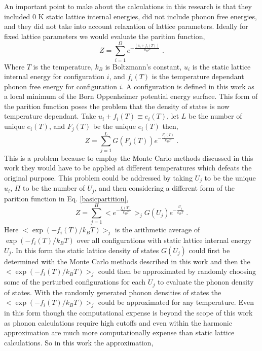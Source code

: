 \documentclass[aps,pre,reprint,superscriptaddress,showkeys]{revtex4-2}
\begin{document}
  An important point to make about the calculations in this research is that they  included 0 K static lattice internal energies, did not include phonon free energies, and they did not take into account relaxation of lattice parameters\cite{Holzwarth_group}. Ideally for fixed lattice parameters we would evaluate the parition function\cite{partition}, 
\begin{equation}
Z = \sum_{i=1}^{\Omega} e^{-\frac{(u_i + f_i(T))}{k_BT}}\;.
\label{basicpartition}
\end{equation}
 Where $T$ is the temperature, $k_B$ is Boltzmann's constant, $u_i$ is the static lattice internal energy for configuration $i$, and $f_i(T)$ is the temperature dependant phonon free energy for configuration $i$. A configuration is defined in this work as a local minimum of the Born Oppenheimer potential energy surface. This form of the parition function poses the problem that the density of states is now temperature dependant.  Take $u_i + f_i(T)\equiv e_i(T)$, let $L$ be the number of unique $e_i(T)$, and $F_j(T)$ be the unique $e_i(T)$ then, 
 \begin{equation}
 Z = \sum_{j=1}^{L}G(F_j(T))e^{-\frac{F_j(T)}{k_BT}}\;.
 \end{equation}
 This is a problem because to employ the Monte Carlo methods discussed in this work they would have to be applied at different temperatures which defeats the original purpose. This problem could be addressed by taking $U_j$ to be the unique $u_i$, $\Pi$ to be the number of $U_j$, and then considering a different form of the parition function in Eq. \ref{basicpartition}, 
 \begin{equation}
 Z= \sum_{j=1}^{\Pi}<e^{-\frac{f_i(T)}{k_BT}}>_jG(U_j)e^{-\frac{U_j}{k_BT}}\;.
 \end{equation}
 Here $<\exp(-f_i(T)/k_BT)>_j$ is the arithmetic average of $\exp(-f_i(T)/k_BT)$ over all configurations with static lattice internal energy $U_j$. In this form the static lattice density of states $G(U_j)$ could first be determined with the Monte Carlo methods described in this work and then the $<\exp(-f_i(T)/k_BT)>_j$ could then be approximated by randomly choosing some of the perturbed configurations for each $U_j$ to evaluate the phonon density of states. With the randomly generated phonon densities of states the $<\exp(-f_i(T)/k_BT)>_j$ could be approximated for any temperature. Even in this form though the computational expense is beyond the scope of this work as phonon calculations require high cutoffs and even within the harmonic approximation are much more computationally expense than static lattice calculations\cite{dfpt_phonons}. So in this work the approximation, 
\end{document}
